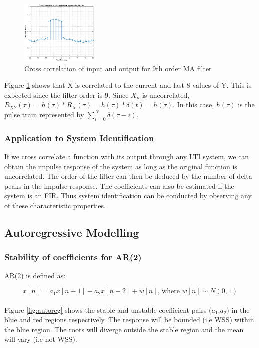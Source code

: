 \documentclass{article}
\begin{document}
\begin{figure}[h!]
\centering
\includegraphics[width=0.33\textwidth]{crosscorr}
\caption{\label{fig:crosscorr} Cross correlation of input and output for 9th order MA filter}
\end{figure}

Figure \ref{fig:crosscorr} shows that X is correlated to the current and last 8 values of Y. This is expected since the filter order is 9. Since $X_n$ is uncorrelated, $R_{XY}(\tau)=h(\tau) \ast R_X(\tau)=h(\tau) \ast \delta (t) = h(\tau)$. In this case, $h(\tau)$ is the pulse train represented by $\sum_{i=0}^N \delta(\tau - i)$.

\subsubsection{Application to System Identification}

If we cross correlate a function with its output through any LTI system, we can obtain the impulse response of the system as long as the original function is uncorrelated. The order of the filter can then be deduced by the number of delta peaks in the impulse response. The coefficients can also be estimated if the system is an FIR. Thus system identification can be conducted by observing any of these characteristic properties.

\pagebreak


\subsection{Autoregressive Modelling}

\subsubsection{Stability of coefficients for AR(2)}

AR(2) is defined as:

\begin{equation}
x[n] = a_1 x[n-1] + a_2 x[n-2] + w[n] \text{,   where } w[n] \sim N(0,1)
\end{equation}
\\
Figure \ref{fig:autoreg} shows the stable and unstable coefficient pairs ($a_1$,$a_2$) in the blue and red regions respectively. The response will be bounded (i.e WSS) within the blue region. The roots will diverge outside the stable region and the mean will vary (i.e not WSS).
\end{document}
